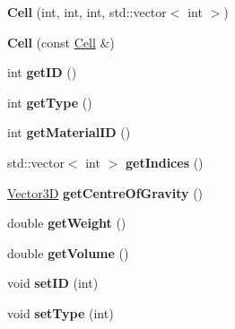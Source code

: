 \begin{DoxyCompactItemize}
\item 
{\bfseries Cell} (int, int, int, std\+::vector$<$ int $>$)\hypertarget{class_cell_ac2b3777a18c004d3ac03becf241259ca}{}\label{class_cell_ac2b3777a18c004d3ac03becf241259ca}

\item 
{\bfseries Cell} (const \hyperlink{class_cell}{Cell} \&)\hypertarget{class_cell_a8ca000885181236a713963c5c8bdb46f}{}\label{class_cell_a8ca000885181236a713963c5c8bdb46f}

\item 
int {\bfseries get\+ID} ()\hypertarget{class_cell_a6fb5e28360b3a6e53400af8b950f6203}{}\label{class_cell_a6fb5e28360b3a6e53400af8b950f6203}

\item 
int {\bfseries get\+Type} ()\hypertarget{class_cell_add3277569149cf78bb6a6e110eb119a6}{}\label{class_cell_add3277569149cf78bb6a6e110eb119a6}

\item 
int {\bfseries get\+Material\+ID} ()\hypertarget{class_cell_a7de149edc6b03f6e25ac75cb2b83709d}{}\label{class_cell_a7de149edc6b03f6e25ac75cb2b83709d}

\item 
std\+::vector$<$ int $>$ {\bfseries get\+Indices} ()\hypertarget{class_cell_abed068e37a2dc9d1972d3a5577429b0d}{}\label{class_cell_abed068e37a2dc9d1972d3a5577429b0d}

\item 
\hyperlink{class_vector3_d}{Vector3D} {\bfseries get\+Centre\+Of\+Gravity} ()\hypertarget{class_cell_ac6f89d89f65ac570dbfee6630e8ac77a}{}\label{class_cell_ac6f89d89f65ac570dbfee6630e8ac77a}

\item 
double {\bfseries get\+Weight} ()\hypertarget{class_cell_a8894ea0d3bf52c4837b95b7ec547392b}{}\label{class_cell_a8894ea0d3bf52c4837b95b7ec547392b}

\item 
double {\bfseries get\+Volume} ()\hypertarget{class_cell_aac8a5f3d06691efa17d909cc4e9c248b}{}\label{class_cell_aac8a5f3d06691efa17d909cc4e9c248b}

\item 
void {\bfseries set\+ID} (int)\hypertarget{class_cell_a8bb0817022a7e100b204ef7ba40d2789}{}\label{class_cell_a8bb0817022a7e100b204ef7ba40d2789}

\item 
void {\bfseries set\+Type} (int)\hypertarget{class_cell_a6dc5008f3f6d93dc0154ca62ec280771}{}\label{class_cell_a6dc5008f3f6d93dc0154ca62ec280771}


\end{DoxyCompactItemize}
